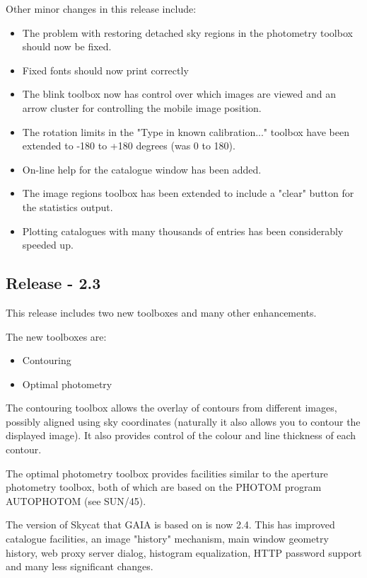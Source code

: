 \documentclass[twoside,11pt]{article}
\newcommand{\xref}[3]{#1}
\renewcommand{\_}{\texttt{\symbol{95}}}
\begin{document}
Other minor changes in this release include:
\begin{itemize}
\item  The problem with restoring detached sky regions in the photometry
  toolbox should now be fixed.

\item Fixed fonts should now print correctly

\item The blink toolbox now has control over which images are viewed
  and an arrow cluster for controlling the mobile image position.

\item The rotation limits in the "Type in known calibration..."
  toolbox have been extended to -180 to +180 degrees
  (was 0 to 180).

\item On-line help for the catalogue window has been added.

\item The image regions toolbox has been extended to include a "clear"
  button for the statistics output.

\item  Plotting catalogues with many thousands of entries has been
  considerably speeded up.
\end{itemize}

\subsection{Release - 2.3}
  This release includes two new toolboxes and many other enhancements.

  The new toolboxes are:
  \begin{itemize}
     \item Contouring
     \item Optimal photometry
  \end{itemize}

  The contouring toolbox allows the overlay of contours from different
  images, possibly aligned using sky coordinates (naturally it also
  allows you to contour the displayed image). It also provides control
  of the colour and line thickness of each contour.

  The optimal photometry toolbox provides facilities similar to the
  aperture photometry toolbox, both of which are based on the PHOTOM
  program AUTOPHOTOM (see \xref{SUN/45}{sun45}{}).

  The version of Skycat that GAIA is based on is now 2.4. This has
  improved catalogue facilities, an image "history" mechanism, main
  window geometry history, web proxy server dialog, histogram
  equalization, HTTP password support and many less significant changes.
\end{document}
